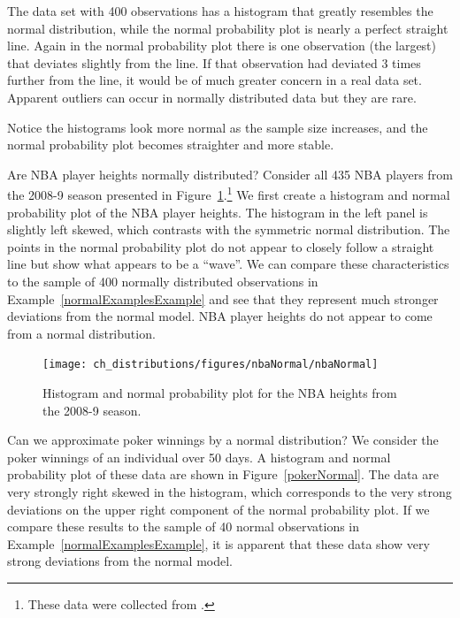 \begin{example}
The data set with 400 observations has a histogram that greatly resembles the normal distribution, while the normal probability plot is nearly a perfect straight line. Again in the normal probability plot there is one observation (the largest) that deviates slightly from the line. If that observation had deviated 3 times further from the line, it would be of much greater concern in a real data set. Apparent outliers can occur in normally distributed data but they are rare.

Notice the histograms look more normal as the sample size increases, and the normal probability plot becomes straighter and more stable.
\end{example}

\begin{example}{Are NBA player heights normally distributed? Consider all 435 NBA players from the 2008-9 season presented in Figure~\ref{nbaNormal}.\footnote{These data were collected from .}}
We first create a histogram and normal probability plot of the NBA player heights. The histogram in the left panel is slightly left skewed, which contrasts with the symmetric normal distribution. The points in the normal probability plot do not appear to closely follow a straight line but show what appears to be a ``wave''. We can compare these characteristics to the sample of 400 normally distributed observations in Example~\ref{normalExamplesExample} and see that they represent much stronger deviations from the normal model. NBA player heights do not appear to come from a normal distribution.
\end{example}

\begin{figure}
\centering
\texttt{[image: ch\_distributions/figures/nbaNormal/nbaNormal]}
\caption{Histogram and normal probability plot for the NBA heights from the 2008-9 season.}
\label{nbaNormal}
\end{figure}

\begin{example}{Can we approximate poker winnings by a normal distribution? We consider the poker winnings of an individual over 50 days. A histogram and normal probability plot of these data are shown in Figure~\ref{pokerNormal}.}
The data are very strongly right skewed in the histogram, which corresponds to the very strong deviations on the upper right component of the normal probability plot. If we compare these results to the sample of 40 normal observations in Example~\ref{normalExamplesExample}, it is apparent that these data show very strong deviations from the normal model.
\end{example}

